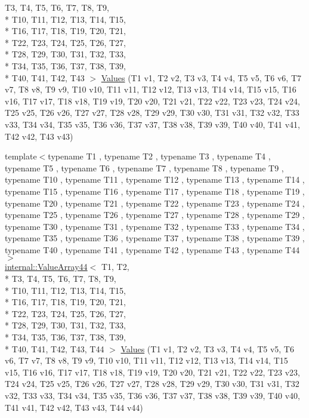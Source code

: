 \begin{DoxyCompactItemize}
T3, T4, T5, T6, T7, T8, T9, \\*
T10, T11, T12, T13, T14, T15, \\*
T16, T17, T18, T19, T20, T21, \\*
T22, T23, T24, T25, T26, T27, \\*
T28, T29, T30, T31, T32, T33, \\*
T34, T35, T36, T37, T38, T39, \\*
T40, T41, T42, T43 $>$ \hyperlink{namespacetesting_a316b2e13e635215ac89a50315bb66d81}{Values} (T1 v1, T2 v2, T3 v3, T4 v4, T5 v5, T6 v6, T7 v7, T8 v8, T9 v9, T10 v10, T11 v11, T12 v12, T13 v13, T14 v14, T15 v15, T16 v16, T17 v17, T18 v18, T19 v19, T20 v20, T21 v21, T22 v22, T23 v23, T24 v24, T25 v25, T26 v26, T27 v27, T28 v28, T29 v29, T30 v30, T31 v31, T32 v32, T33 v33, T34 v34, T35 v35, T36 v36, T37 v37, T38 v38, T39 v39, T40 v40, T41 v41, T42 v42, T43 v43)
\item 
{\footnotesize template$<$typename T1 , typename T2 , typename T3 , typename T4 , typename T5 , typename T6 , typename T7 , typename T8 , typename T9 , typename T10 , typename T11 , typename T12 , typename T13 , typename T14 , typename T15 , typename T16 , typename T17 , typename T18 , typename T19 , typename T20 , typename T21 , typename T22 , typename T23 , typename T24 , typename T25 , typename T26 , typename T27 , typename T28 , typename T29 , typename T30 , typename T31 , typename T32 , typename T33 , typename T34 , typename T35 , typename T36 , typename T37 , typename T38 , typename T39 , typename T40 , typename T41 , typename T42 , typename T43 , typename T44 $>$ }\\\hyperlink{classtesting_1_1internal_1_1_value_array44}{internal\-::\-Value\-Array44}$<$ T1, T2, \\*
T3, T4, T5, T6, T7, T8, T9, \\*
T10, T11, T12, T13, T14, T15, \\*
T16, T17, T18, T19, T20, T21, \\*
T22, T23, T24, T25, T26, T27, \\*
T28, T29, T30, T31, T32, T33, \\*
T34, T35, T36, T37, T38, T39, \\*
T40, T41, T42, T43, T44 $>$ \hyperlink{namespacetesting_a42848f3794e196c5a74f4b21db0752dd}{Values} (T1 v1, T2 v2, T3 v3, T4 v4, T5 v5, T6 v6, T7 v7, T8 v8, T9 v9, T10 v10, T11 v11, T12 v12, T13 v13, T14 v14, T15 v15, T16 v16, T17 v17, T18 v18, T19 v19, T20 v20, T21 v21, T22 v22, T23 v23, T24 v24, T25 v25, T26 v26, T27 v27, T28 v28, T29 v29, T30 v30, T31 v31, T32 v32, T33 v33, T34 v34, T35 v35, T36 v36, T37 v37, T38 v38, T39 v39, T40 v40, T41 v41, T42 v42, T43 v43, T44 v44)

\end{DoxyCompactItemize}

